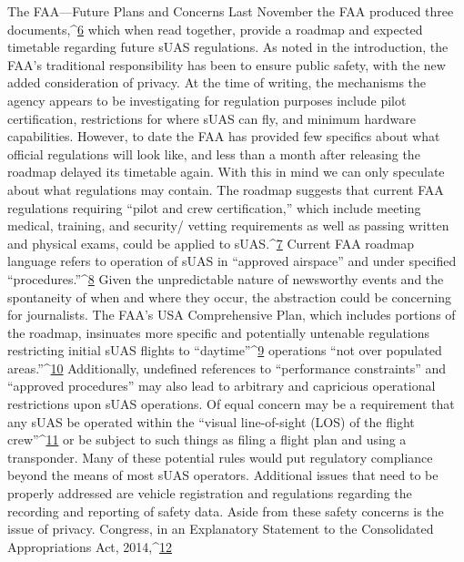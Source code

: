 The FAA—Future Plans and Concerns
Last November the FAA produced three documents,^{\href{#endnotes-waite-and-osterreicher}{6}} which when read
together, provide a roadmap and expected timetable regarding future sUAS
regulations. As noted in the introduction, the FAA's traditional responsibility
has been to ensure public safety, with the new added consideration of
privacy. At the time of writing, the mechanisms the agency appears to be
investigating for regulation purposes include pilot certification, restrictions
for where sUAS can fly, and minimum hardware capabilities. However, to
date the FAA has provided few specifics about what official regulations will
look like, and less than a month after releasing the roadmap delayed its
timetable again.
With this in mind we can only speculate about what regulations may contain.
The roadmap suggests that current FAA regulations requiring ``pilot
and crew certification,'' which include meeting medical, training, and security/
vetting requirements as well as passing written and physical exams,
could be applied to sUAS.^{\href{#endnotes-waite-and-osterreicher}{7}}
Current FAA roadmap language refers to operation of sUAS in ``approved
airspace'' and under specified ``procedures.''^{\href{#endnotes-waite-and-osterreicher}{8}} Given the unpredictable
nature of newsworthy events and the spontaneity of when and where they
occur, the abstraction could be concerning for journalists. The FAA's USA
Comprehensive Plan, which includes portions of the roadmap, insinuates
more specific and potentially untenable regulations restricting initial sUAS flights to ``daytime''^{\href{#endnotes-waite-and-osterreicher}{9}} operations ``not over populated areas.''^{\href{#endnotes-waite-and-osterreicher}{10}} Additionally,
undefined references to ``performance constraints'' and ``approved procedures''
may also lead to arbitrary and capricious operational restrictions
upon sUAS operations.
Of equal concern may be a requirement that any sUAS be operated within
the ``visual line-of-sight (LOS) of the flight crew''^{\href{#endnotes-waite-and-osterreicher}{11}} or be subject to such things
as filing a flight plan and using a transponder. Many of these potential rules
would put regulatory compliance beyond the means of most sUAS operators.
Additional issues that need to be properly addressed are vehicle registration
and regulations regarding the recording and reporting of safety data.
Aside from these safety concerns is the issue of privacy. Congress, in an
Explanatory Statement to the Consolidated Appropriations Act, 2014,^{\href{#endnotes-waite-and-osterreicher}{12}}
